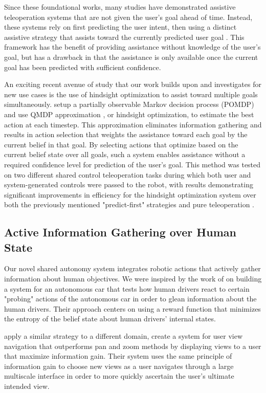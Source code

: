 \documentclass[conference]{IEEEtran}
\begin{document}
Since these foundational works, many studies have demonstrated assistive teleoperation systems that are not given the user's goal ahead of time. Instead, these systems rely on first predicting the user intent, then using a distinct assistive strategy that assists toward the currently predicted user goal \cite{dragan2012formalizing, fagg2004extracting, kragic2005human, schultz2017goal, yu2005telemanipulation}. This framework has the benefit of providing assistance without knowledge of the user's goal, but has a drawback in that the assistance is only available once the current goal has been predicted with sufficient confidence. 

An exciting recent avenue of study that our work builds upon and investigates for new use cases is the use of hindsight optimization to assist toward multiple goals simultaneously. \citet{javdani2015shared} setup a partially observable Markov decision process (POMDP) and use QMDP approximation \cite{littman1995learning}, or hindsight optimization, to estimate the best action at each timestep. This approximation eliminates information gathering and results in action selection that weights the assistance toward each goal by the current belief in that goal. By selecting actions that optimize based on the current belief state over all goals, such a system enables assistance without a required confidence level for prediction of the user's goal. This method was tested on two different shared control teleoperation tasks during which both user and system-generated controls were passed to the robot, with results demonstrating significant improvements in efficiency for the hindsight optimization system over both the previously mentioned "predict-first" strategies and pure teleoperation \cite{javdani2018shared}.

\subsection{Active Information Gathering over Human State}
Our novel shared autonomy system integrates robotic actions that actively gather information about human objectives. We were inspired by the work of \citet{sadigh2016information} on building a system for an autonomous car that tests how human drivers react to certain "probing" actions of the autonomous car in order to glean information about the human drivers. Their approach centers on using a reward function that minimizes the entropy of the belief state about human drivers' internal states.

\citet{liu2017bignav} apply a similar strategy to a different domain, create a system for user view navigation that outperforms pan and zoom methods by displaying views to a user that maximize information gain. Their system uses the same principle of information gain to choose new views as a user navigates through a large multiscale interface in order to more quickly ascertain the user's ultimate intended view.
\end{document}
